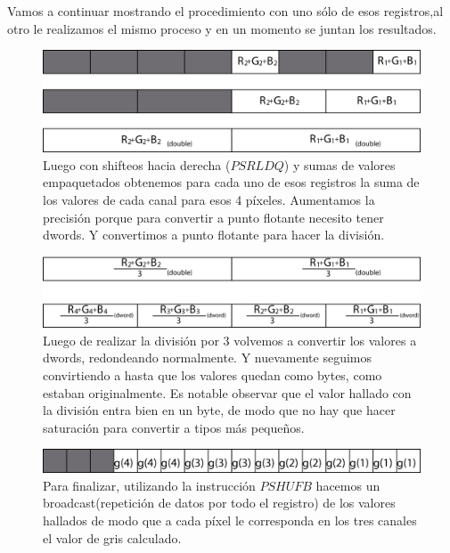 	Vamos a continuar mostrando el procedimiento con uno s\'olo de esos registros,al otro le realizamos el mismo proceso y en un momento se juntan los resultados.
	
	\begin{figure}[H]
		\includegraphics[scale=0.9]{imgs/fcolor_asm3.png}
		\caption{Luego con shifteos hacia derecha ($PSRLDQ$) y sumas de valores empaquetados obtenemos para cada uno de esos registros la suma de los valores de cada canal para esos 4 p\'ixeles. Aumentamos la precisi\'on porque para convertir a punto flotante necesito tener dwords. Y convertimos a punto flotante para hacer la divisi\'on.}
	\end{figure}
	
	\begin{figure}[H]
		\includegraphics[scale=0.9]{imgs/fcolor_asm4.png}
		\caption{Luego de realizar la divisi\'on por 3 volvemos a convertir los valores a dwords, redondeando normalmente. Y nuevamente seguimos convirtiendo a hasta que los valores quedan como bytes, como estaban originalmente. Es notable observar que el valor hallado con la divisi\'on entra bien en un byte, de modo que no hay que hacer saturaci\'on para convertir a tipos m\'as peque\~nos.}
	\end{figure}
	
	\begin{figure}[H]
		\includegraphics[scale=0.9]{imgs/fcolor_asm5.png}
		\caption{Para finalizar, utilizando la instrucci\'on $PSHUFB$ hacemos un broadcast(repetici\'on de datos por todo el registro) de los valores hallados de modo que a cada p\'ixel le corresponda en los tres canales el valor de gris calculado.}
	\end{figure}
	
